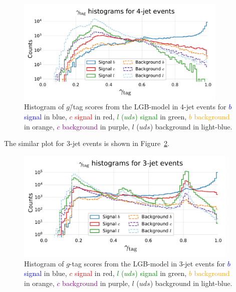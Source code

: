 \begin{figure}[h!]
  \centerfloat
  \includegraphics[width=0.9\textwidth, trim=10 10 10 45, clip]{figures/quarks/gtag-histogram-sigbkg-down_sample=1.00-ML_vars=vertex-selection=b-ejet_min=4-n_iter_RS_lgb=99-n_iter_RS_xgb=9-cdot_cut=0.90-version=19-njet=4.pdf}
  \caption[Distribution of $g$\=/Tag Scores in 4-Jet Events for Signal and Background]
          {Histogram of $g$\=/tag scores from the LGB-model in 4-jet events for \textcolor{blue}{$b$ signal} in blue, \textcolor{red}{$c$ signal} in red, \textcolor{green}{$l$ ($uds$) signal} in green, \textcolor{orange}{$b$ background} in orange, \textcolor{purple}{$c$ background} in purple, \textcolor{light-blue}{$l$ ($uds$) background} in light-blue.} 
  \label{fig:q:gtag_scores_4j_sig_bkg}
\end{figure}
\vspace{-3mm}

The similar plot for 3-jet events is shown in Figure~\ref{fig:q:gtag_scores_3j_sig_bkg}. 

\begin{figure}
  \includegraphics[width=0.95\textwidth, trim=10 10 10 45, clip]{figures/quarks/gtag-histogram-sigbkg-down_sample=1.00-ML_vars=vertex-selection=b-ejet_min=4-n_iter_RS_lgb=99-n_iter_RS_xgb=9-cdot_cut=0.90-version=19-njet=3.pdf}
  \caption[Distribution of $g$-Tag Scores in 3-Jet Events for Signal and Background]
          {Histogram of $g$-tag scores from the LGB-model in 3-jet events for \textcolor{blue}{$b$ signal} in blue, \textcolor{red}{$c$ signal} in red, \textcolor{green}{$l$ ($uds$) signal} in green, \textcolor{orange}{$b$ background} in orange, \textcolor{purple}{$c$ background} in purple, \textcolor{light-blue}{$l$ ($uds$) background} in light-blue.   } 
  \label{fig:q:gtag_scores_3j_sig_bkg}
\end{figure}

